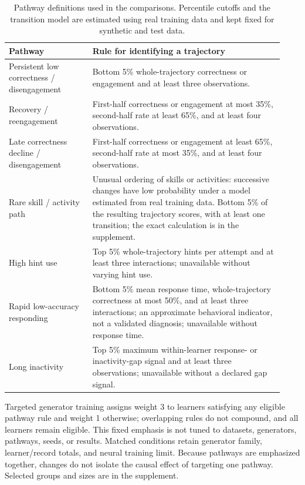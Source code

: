 \documentclass[fleqn,10pt]{JLA_article}
\begin{document}
\begin{table}[!htbp]
\centering
\caption{Pathway definitions used in the comparisons. Percentile cutoffs and the transition model are estimated using real training data and kept fixed for synthetic and test data.}
\label{tab:rare-definitions}
\small
\begin{tabular}{>{\raggedright\arraybackslash}p{0.29\linewidth}p{0.64\linewidth}}
\toprule
Pathway & Rule for identifying a trajectory \\
\midrule
Persistent low correctness / disengagement & Bottom 5\% whole-trajectory correctness or engagement and at least three observations. \\
Recovery / reengagement & First-half correctness or engagement at most 35\%, second-half rate at least 65\%, and at least four observations. \\
Late correctness decline / disengagement & First-half correctness or engagement at least 65\%, second-half rate at most 35\%, and at least four observations. \\
Rare skill / activity path & Unusual ordering of skills or activities: successive changes have low probability under a model estimated from real training data. Bottom 5\% of the resulting trajectory scores, with at least one transition; the exact calculation is in the supplement. \\
High hint use & Top 5\% whole-trajectory hints per attempt and at least three interactions; unavailable without varying hint use. \\
Rapid low-accuracy responding & Bottom 5\% mean response time, whole-trajectory correctness at most 50\%, and at least three interactions; an approximate behavioral indicator, not a validated diagnosis; unavailable without response time. \\
Long inactivity & Top 5\% maximum within-learner response- or inactivity-gap signal and at least three observations; unavailable without a declared gap signal. \\
\bottomrule
\end{tabular}
\end{table}

Targeted generator training assigns weight 3 to learners satisfying any eligible pathway rule and weight 1 otherwise; overlapping rules do not compound, and all learners remain eligible. This fixed emphasis is not tuned to datasets, generators, pathways, seeds, or results. Matched conditions retain generator family, learner/record totals, and neural training limit. Because pathways are emphasized together, changes do not isolate the causal effect of targeting one pathway. Selected groups and sizes are in the supplement.
\end{document}
